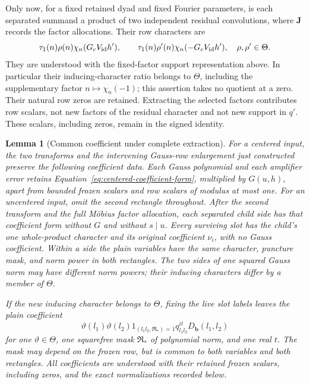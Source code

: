 \documentclass[11pt,a4paper]{article}
\numberwithin{equation}{section}
\numberwithin{figure}{section}
\newtheorem{lemma}[theorem]{Lemma}
\theoremstyle{definition}
\theoremstyle{remark}
\begin{document}
Only now, for a fixed retained dyad and fixed Fourier parameters,
is each separated summand a product of two independent residual
convolutions, where \(\mathbf J\) records the factor allocations.
Their row characters are
\[
 \tau_1(n)\rho(n)\chi_n(G_cV_{\rm id}h'),\qquad
 \tau_1(n)\rho'(n)\chi_n(-G_cV_{\rm id}h'),
 \quad \rho,\rho'\in\Theta.
\]
They are understood with the fixed-factor support representation
above.  In particular their inducing-character ratio belongs to
\(\Theta\), including the supplementary factor
\(n\mapsto\chi_n(-1)\); this assertion takes no quotient at a zero.
Their natural row zeros are retained.  Extracting
the selected factors contributes row scalars, not new factors of the
residual character and not new support in \(q'\).  These scalars,
including zeros, remain in the signed identity.

\begin{lemma}[Common coefficient under complete extraction]
\label{lem:centered-coefficient-invariant}
For a centered input, the two transforms and the intervening Gauss-row
enlargement just constructed preserve the following coefficient data.
Each Gauss polynomial and each amplifier error retains
Equation~\eqref{eq:centered-coefficient-form}, multiplied by \(G(u,h)\),
apart from bounded frozen scalars and row scalars of modulus at most one.
For an uncentered input, omit the second rectangle throughout.
After the second transform and the full M\"obius factor allocation, each
separated child side has that coefficient form without \(G\) and without
\(s\mid u\).  Every surviving slot has the child's one whole-product
character and its original coefficient \(\nu_i\), with no Gauss coefficient.
Within a side the plain variables have the same character, puncture mask,
and norm power in both rectangles.  The two sides of one squared Gauss norm
may have different norm powers; their inducing characters differ by a
member of \(\Theta\).

If the new inducing character belongs to \(\Theta\), fixing the live slot
labels leaves the plain coefficient
\[
 \vartheta(l_1)\vartheta(l_2)
 1_{(l_1l_2,\mathfrak R_*)=1}q_{l_1l_2}^{it}D_{\mathbf b}(l_1,l_2)
\]
for one \(\vartheta\in\Theta\), one squarefree mask
\(\mathfrak R_*\) of polynomial norm, and one real \(t\).
The mask may depend on the frozen row, but is common to both variables
and both rectangles.  All coefficients are understood with their retained
frozen scalars, including zeros, and the exact normalizations recorded below.
\end{lemma}
\end{document}
